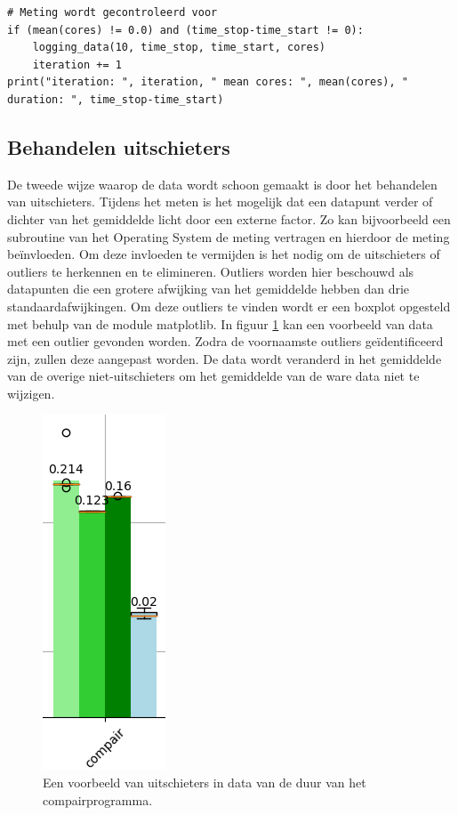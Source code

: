 	\newpage
	
	\begin{lstlisting}[caption={Controleren op meetfouten.}, captionpos=b,label={lst:meetfout}]
# Meting wordt gecontroleerd voor 
if (mean(cores) != 0.0) and (time_stop-time_start != 0):
	logging_data(10, time_stop, time_start, cores)
	iteration += 1
print("iteration: ", iteration, " mean cores: ", mean(cores), " duration: ", time_stop-time_start)
\end{lstlisting}
	
	
	\subsection{Behandelen uitschieters}
	De tweede wijze waarop de data wordt schoon gemaakt is door het behandelen van uitschieters. Tijdens het meten is het mogelijk dat een datapunt verder of dichter van het gemiddelde licht door een externe factor. Zo kan bijvoorbeeld een subroutine van het Operating System de meting vertragen en hierdoor de meting be\"invloeden. Om deze invloeden te vermijden is het nodig om de uitschieters of outliers te herkennen en te elimineren. Outliers worden hier beschouwd als datapunten die een grotere afwijking van het gemiddelde hebben dan drie standaardafwijkingen. Om deze outliers te vinden wordt er een boxplot opgesteld met behulp van de module matplotlib. In figuur \ref{fig:outliers} kan een voorbeeld van data met een outlier gevonden worden. Zodra de voornaamste outliers ge\"identificeerd zijn, zullen deze aangepast worden. De data wordt veranderd in het gemiddelde van de overige niet-uitschieters om het gemiddelde van de ware data niet te wijzigen. 

	\begin{figure}
		\centering
		\includegraphics{afbeeldingen/outliers.png}
		\caption{Een voorbeeld van uitschieters in data van de duur van het compairprogramma.}
		\label{fig:outliers}
	\end{figure}

